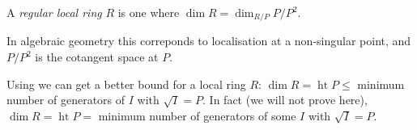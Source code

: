 \documentclass[a4paper]{article}
\DeclareMathOperator{\htt}{ht} %
\begin{document}
\begin{definition}
  A \emph{regular local ring} \(R\) is one where \(\dim R = \dim_{R/P} P/P^2\).
\end{definition}

In algebraic geometry this correponds to localisation at a non-singular point, and \(P/P^2\) is the cotangent space at \(P\).

\begin{remark}
  Using  we can get a better bound for a local ring \(R\): \(\dim R = \htt P \leq \) minimum number of generators of \(I\) with \(\sqrt I = P\). In fact (we will not prove here), \(\dim R = \htt P =\) minimum number of generators of some \(I\) with \(\sqrt I = P\).
\end{remark}
\end{document}
